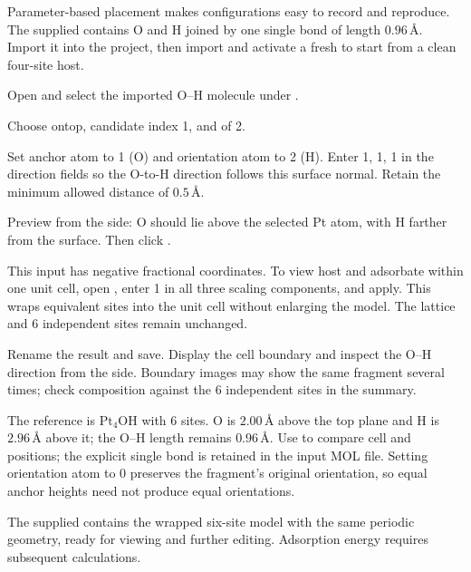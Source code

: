 Parameter-based placement makes configurations easy to record and reproduce. The supplied  contains O and H joined by one single bond of length $0.96\,\text{\AA}$. Import it into the project, then import and activate a fresh  to start from a clean four-site host.

\begin{steps}
  \item Open  and select the imported O--H molecule under .
  \item Choose ontop, candidate index 1, and  of 2.
  \item Set anchor atom to 1 (O) and orientation atom to 2 (H). Enter 1, 1, 1 in the direction fields so the O-to-H direction follows this surface normal. Retain the minimum allowed distance of $0.5\,\text{\AA}$.
  \item Preview from the side: O should lie above the selected Pt atom, with H farther from the surface. Then click .
  \item This input has negative fractional coordinates. To view host and adsorbate within one unit cell, open , enter 1 in all three scaling components, and apply. This wraps equivalent sites into the unit cell without enlarging the model. The lattice and 6 independent sites remain unchanged.
  \item Rename the result  and save. Display the cell boundary and inspect the O--H direction from the side. Boundary images may show the same fragment several times; check composition against the 6 independent sites in the summary.
\end{steps}



The reference is $\mathrm{Pt_4OH}$ with 6 sites. O is $2.00\,\text{\AA}$ above the top plane and H is $2.96\,\text{\AA}$ above it; the O--H length remains $0.96\,\text{\AA}$. Use  to compare cell and positions; the explicit single bond is retained in the input MOL file. Setting orientation atom to 0 preserves the fragment's original orientation, so equal anchor heights need not produce equal orientations.

The supplied  contains the wrapped six-site model with the same periodic geometry, ready for viewing and further editing. Adsorption energy requires subsequent calculations.

